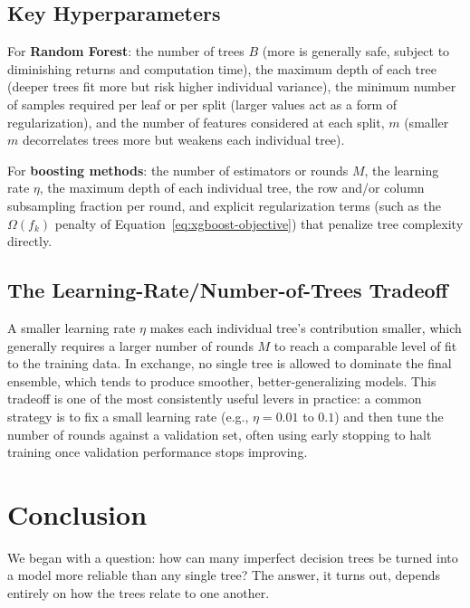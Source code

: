 \documentclass[12pt,a4paper]{article}
\begin{document}
\subsection{Key Hyperparameters}

For \textbf{Random Forest}: the number of trees $B$ (more is generally safe, subject to diminishing returns and computation time), the maximum depth of each tree (deeper trees fit more but risk higher individual variance), the minimum number of samples required per leaf or per split (larger values act as a form of regularization), and the number of features considered at each split, $m$ (smaller $m$ decorrelates trees more but weakens each individual tree).

For \textbf{boosting methods}: the number of estimators or rounds $M$, the learning rate $\eta$, the maximum depth of each individual tree, the row and/or column subsampling fraction per round, and explicit regularization terms (such as the $\Omega(f_k)$ penalty of Equation~\eqref{eq:xgboost-objective}) that penalize tree complexity directly.

\subsection{The Learning-Rate/Number-of-Trees Tradeoff}

A smaller learning rate $\eta$ makes each individual tree's contribution smaller, which generally requires a larger number of rounds $M$ to reach a comparable level of fit to the training data. In exchange, no single tree is allowed to dominate the final ensemble, which tends to produce smoother, better-generalizing models. This tradeoff is one of the most consistently useful levers in practice: a common strategy is to fix a small learning rate (e.g., $\eta = 0.01$ to $0.1$) and then tune the number of rounds against a validation set, often using early stopping to halt training once validation performance stops improving.

\section{Conclusion}

We began with a question: how can many imperfect decision trees be turned into a model more reliable than any single tree? The answer, it turns out, depends entirely on how the trees relate to one another.
\end{document}
